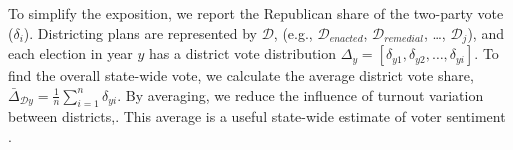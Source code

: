 	To simplify the exposition, we report the Republican share of the two-party vote ($\delta_{i}$). Districting plans are represented by $\mathcal D $, (e.g., $\mathcal D_{enacted}$, $\mathcal D_{remedial}$, \dots, $\mathcal D_{j}$), and each election in year $ y $ has a district vote distribution $ \Delta_{y} = [\delta_{y1}, \delta_{y2}, \dots, \delta_{yi}] $. To find the overall state-wide vote, we calculate the average district vote share, $ \bar{\Delta}_{\mathcal D y} = \frac{1}{n}\sum\limits_{i=1}^{n} \delta_{yi} $. By averaging, we reduce the influence of turnout variation between districts,. This average is a useful state-wide estimate of voter sentiment \citep[see e.g.][]{Kastellec_et_al_2008_PS}.
	
	
